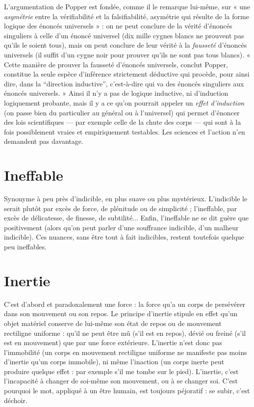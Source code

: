 L’argumentation de Popper est fondée, comme il le remarque lui-même,
sur « une {\it asymétrie} entre la vérifiabilité et la falsifiabilité, asymétrie qui résulte
de la forme logique des énoncés universels » : on ne peut conclure de la vérité
d’énoncés singuliers à celle d’un énoncé universel (dix mille cygnes blancs ne
prouvent pas qu’ils le soient tous), mais on peut conclure de leur vérité à la
{\it fausseté} d’énoncés universels (il suffit d’un cygne noir pour prouver qu’ils ne
sont pas tous blancs). « Cette manière de prouver la fausseté d’énoncés universels,
conclut Popper, constitue la seule espèce d’inférence strictement
déductive qui procède, pour ainsi dire, dans la “direction inductive”, c’est-à-dire
qui va des énoncés singuliers aux énoncés universels. » Ainsi il n’y a pas
de logique inductive, ni d’induction logiquement probante, mais il y a ce
qu’on pourrait appeler un {\it effet d'induction} (on passe bien du particulier au
général ou à l’universel) qui permet d’énoncer des lois scientifiques — par
exemple celle de la chute des corps — qui sont à la fois possiblement vraies et
empiriquement testables. Les sciences et l’action n’en demandent pas davantage.

\section{Ineffable}
Synonyme à peu près d’indicible, en plus suave ou plus mystérieux.
L’indicible le serait plutôt par excès de force, de plénitude
ou de simplicité ; l’ineffable, par excès de délicatesse, de finesse, de subtilité...
Enfin, l’ineffable ne se dit guère que positivement (alors qu'on peut
parler d’une souffrance indicible, d’un malheur indicible). Ces nuances, sans
être tout à fait indicibles, restent toutefois quelque peu ineffables.

\section{Inertie}
C’est d’abord et paradoxalement une force : la force qu’a un corps
de persévérer dans son mouvement ou son repos. Le principe
d'inertie stipule en effet qu’un objet matériel conserve de lui-même son état de
repos ou de mouvement rectiligne uniforme : qu’il ne peut être mû (s’il est en
repos), dévié ou freiné (s’il est en mouvement) que par une force extérieure.
L’inertie n’est donc pas l’immobilité (un corps en mouvement rectiligne uniforme
ne manifeste pas moins d’inertie qu’un corps immobile), ni même l’inaction
(un corps inerte peut produire quelque effet : par exemple s’il me tombe
sur le pied). L’inertie, c’est l'incapacité à changer de soi-même son mouvement,
ou à se changer soi. C’est pourquoi le mot, appliqué à un être humain, est toujours
péjoratif : se subir, c’est déchoir.
